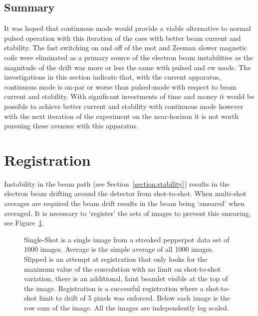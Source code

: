 \subsection{Summary}

It was hoped that continuous mode would provide a viable alternative to normal pulsed operation with this iteration of the \gls{caes} with better beam current and stability.
The fast switching on and off of the \gls{mot} and Zeeman slower magnetic coils were eliminated as a primary source of the electron beam instabilities as the magnitude of the drift was more or less the same with pulsed and \gls{cw} mode.
The investigations in this section indicate that, with the current apparatus, continuous mode is on-par or worse than pulsed-mode with respect to beam current and stability.
With significant investments of time and money it would be possible to achieve better current and stability with continuous mode however with the next iteration of the experiment on the near-horizon it is not worth pursuing these avenues with this apparatus.

\section{Registration}\label{section:registration}

Instability in the beam path (see Section~\ref{section:stability}) results in the electron beam drifting around the detector from shot-to-shot.
When multi-shot averages are required the beam drift results in the beam being `smeared' when averaged.
It is necessary to `register' the sets of images to prevent this smearing, see Figure~\ref{figure:registration_examples}.

\begin{figure}
    \center
    
    \caption[Image registration examples.]{Single-Shot is a single image from a streaked pepperpot data set of 1000 images. Average is the simple average of all 1000 images. Slipped is an attempt at registration that only looks for the maximum value of the convolution with no limit on shot-to-shot variation, there is an additional, faint beamlet visible at the top of the image. Registration is a successful registration where a shot-to-shot limit to drift of 5 pixels was enforced. Below each image is the row sum of the image. All the images are independently log scaled.}
    \label{figure:registration_examples}
\end{figure}

